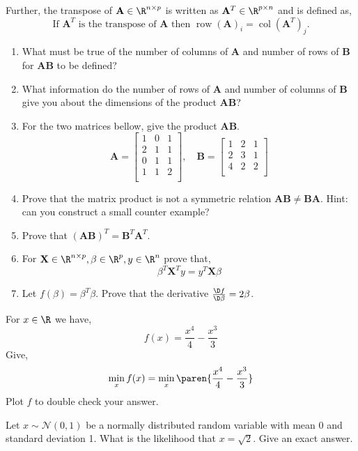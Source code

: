 \documentclass{homework}
\DeclareMathOperator{\row}{row}
\DeclareMathOperator{\col}{col}
\begin{document}
Further, the transpose of $\mathbf{A} \in \R^{n\times p}$ is written as $\mathbf{A}^T \in \R^{p\times n}$ and is defined as,
\[
  \text{If } \mathbf{A}^T \text{ is the transpose of } \mathbf{A} \text{ then } \row(\mathbf{A})_i = \col(\mathbf{A}^T)_j.
\]
\begin{enumerate}[label=(\alph*)]
  \item What must be true of the number of columns of $\mathbf{A}$ and number of rows of $\mathbf{B}$ for $\mathbf{AB}$ to be defined?
  \item What information do the number of rows of $\mathbf{A}$ and number of columns of $\mathbf{B}$ give you about the dimensions of the product $\mathbf{AB}$?
  \item For the two matrices bellow, give the product $\mathbf{AB}$.
        \[
          \mathbf{A} = \begin{bmatrix} 1 & 0 & 1 \\   2 & 1 & 1 \\   0 & 1 & 1 \\   1 & 1 & 2 \\   \end{bmatrix}, \quad
          \mathbf{B} = \begin{bmatrix} 1 & 2 & 1 \\   2 & 3 & 1 \\   4 & 2 & 2 \\   \end{bmatrix}
        \]
  \item Prove that the matrix product is not a symmetric relation \ie $\mathbf{AB} \neq \mathbf{BA}$.  Hint: can you construct a small counter example?
  \item Prove that $\mathbf{(AB)}^T = \mathbf{B}^T\mathbf{A}^T$.
  \item For $\mathbf{X} \in \R^{n\times p}, \beta \in \R^p, y \in \R^n$ prove that,
        \[
          \beta^T\mathbf{X}^Ty = y^T\mathbf{X}\beta
        \]
  \item Let $f(\beta) = \beta^T\beta$. Prove that the derivative $\frac{\D f}{\D \beta} = 2\beta$.
\end{enumerate}

\question For $x \in \R$ we have,
\[
  f(x) = \frac{x^4}{4} - \frac{x^3}{3}
\]
Give,
\[
  \min_xf(x) = \min_x\paren{\frac{x^4}{4} - \frac{x^3}{3}}
\]
Plot $f$ to double check your answer.

\question Let $x \sim \mathcal{N}(0, 1)$ be a normally distributed random variable with mean 0 and standard deviation 1.  What is the likelihood that $x=\sqrt{2}$. Give an exact answer.
\end{document}
